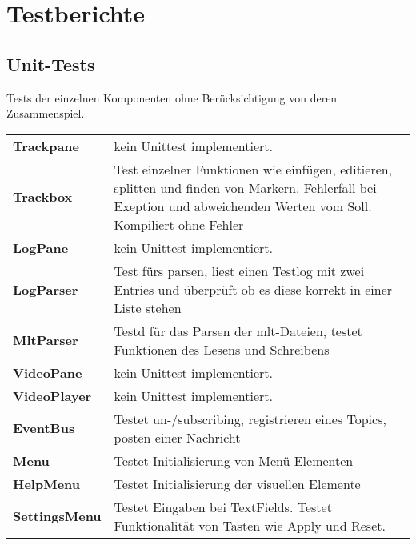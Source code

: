 \chapter{Testberichte}

\section{Unit-Tests}
Tests der einzelnen Komponenten ohne Berücksichtigung von deren Zusammenspiel.
\begin{tabularx}{\textwidth}{lX}
\textbf{Trackpane}&kein Unittest implementiert.\\
\textbf{Trackbox}&Test einzelner Funktionen wie einfügen, editieren, splitten und finden von Markern. Fehlerfall bei Exeption und abweichenden Werten vom Soll. Kompiliert ohne Fehler\\
\textbf{LogPane}&kein Unittest implementiert.\\
\textbf{LogParser}&Test fürs parsen, liest einen Testlog mit zwei Entries und überprüft ob es diese korrekt in einer Liste stehen\\
\textbf{MltParser}&Testd für das Parsen der mlt-Dateien, testet Funktionen des Lesens und Schreibens \\
\textbf{VideoPane}&kein Unittest implementiert.\\
\textbf{VideoPlayer}&kein Unittest implementiert.\\
\textbf{EventBus}&Testet un-/subscribing, registrieren eines Topics, posten einer Nachricht\\
\textbf{Menu}&Testet Initialisierung von Menü Elementen\\
\textbf{HelpMenu}&Testet Initialisierung der visuellen Elemente\\
\textbf{SettingsMenu}&Testet Eingaben bei TextFields. Testet Funktionalität von Tasten wie Apply und Reset.\\
\end{tabularx}